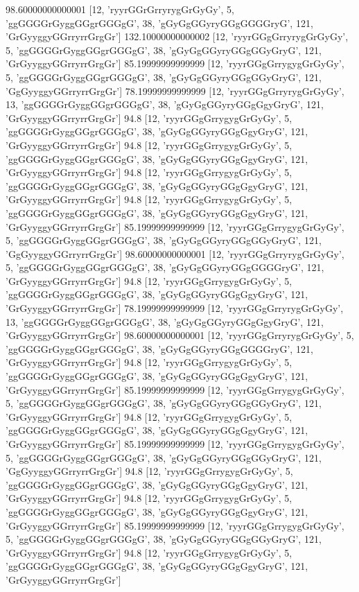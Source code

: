 98.60000000000001 [12, 'ryyrGGrGrryrygGrGyGy', 5, 'ggGGGGrGyggGGgrGGGgG', 38, 'gGyGgGGyryGGgGGGGryG', 121, 'GrGyyggyGGrryrrGrgGr']
132.10000000000002 [12, 'ryyrGGgGrryrygGrGyGy', 5, 'ggGGGGrGyggGGgrGGGgG', 38, 'gGyGgGGyryGGgGGyGryG', 121, 'GrGyyggyGGrryrrGrgGr']
85.19999999999999 [12, 'ryyrGGgGrrygygGrGyGy', 5, 'ggGGGGrGyggGGgrGGGgG', 38, 'gGyGgGGyryGGgGGyGryG', 121, 'GgGyyggyGGrryrrGrgGr']
78.19999999999999 [12, 'ryyrGGgGrryrygGrGyGy', 13, 'ggGGGGrGyggGGgrGGGgG', 38, 'gGyGgGGyryGGgGgyGryG', 121, 'GrGyyggyGGrryrrGrgGr']
94.8 [12, 'ryyrGGgGrrygygGrGyGy', 5, 'ggGGGGrGyggGGgrGGGgG', 38, 'gGyGgGGyryGGgGgyGryG', 121, 'GrGyyggyGGrryrrGrgGr']
94.8 [12, 'ryyrGGgGrrygygGrGyGy', 5, 'ggGGGGrGyggGGgrGGGgG', 38, 'gGyGgGGyryGGgGgyGryG', 121, 'GrGyyggyGGrryrrGrgGr']
94.8 [12, 'ryyrGGgGrrygygGrGyGy', 5, 'ggGGGGrGyggGGgrGGGgG', 38, 'gGyGgGGyryGGgGgyGryG', 121, 'GrGyyggyGGrryrrGrgGr']
94.8 [12, 'ryyrGGgGrrygygGrGyGy', 5, 'ggGGGGrGyggGGgrGGGgG', 38, 'gGyGgGGyryGGgGgyGryG', 121, 'GrGyyggyGGrryrrGrgGr']
85.19999999999999 [12, 'ryyrGGgGrrygygGrGyGy', 5, 'ggGGGGrGyggGGgrGGGgG', 38, 'gGyGgGGyryGGgGGyGryG', 121, 'GgGyyggyGGrryrrGrgGr']
98.60000000000001 [12, 'ryyrGGgGrryrygGrGyGy', 5, 'ggGGGGrGyggGGgrGGGgG', 38, 'gGyGgGGyryGGgGGGGryG', 121, 'GrGyyggyGGrryrrGrgGr']
94.8 [12, 'ryyrGGgGrrygygGrGyGy', 5, 'ggGGGGrGyggGGgrGGGgG', 38, 'gGyGgGGyryGGgGgyGryG', 121, 'GrGyyggyGGrryrrGrgGr']
78.19999999999999 [12, 'ryyrGGgGrryrygGrGyGy', 13, 'ggGGGGrGyggGGgrGGGgG', 38, 'gGyGgGGyryGGgGgyGryG', 121, 'GrGyyggyGGrryrrGrgGr']
98.60000000000001 [12, 'ryyrGGgGrryrygGrGyGy', 5, 'ggGGGGrGyggGGgrGGGgG', 38, 'gGyGgGGyryGGgGGGGryG', 121, 'GrGyyggyGGrryrrGrgGr']
94.8 [12, 'ryyrGGgGrrygygGrGyGy', 5, 'ggGGGGrGyggGGgrGGGgG', 38, 'gGyGgGGyryGGgGgyGryG', 121, 'GrGyyggyGGrryrrGrgGr']
85.19999999999999 [12, 'ryyrGGgGrrygygGrGyGy', 5, 'ggGGGGrGyggGGgrGGGgG', 38, 'gGyGgGGyryGGgGGyGryG', 121, 'GrGyyggyGGrryrrGrgGr']
94.8 [12, 'ryyrGGgGrrygygGrGyGy', 5, 'ggGGGGrGyggGGgrGGGgG', 38, 'gGyGgGGyryGGgGgyGryG', 121, 'GrGyyggyGGrryrrGrgGr']
85.19999999999999 [12, 'ryyrGGgGrrygygGrGyGy', 5, 'ggGGGGrGyggGGgrGGGgG', 38, 'gGyGgGGyryGGgGGyGryG', 121, 'GgGyyggyGGrryrrGrgGr']
94.8 [12, 'ryyrGGgGrrygygGrGyGy', 5, 'ggGGGGrGyggGGgrGGGgG', 38, 'gGyGgGGyryGGgGgyGryG', 121, 'GrGyyggyGGrryrrGrgGr']
94.8 [12, 'ryyrGGgGrrygygGrGyGy', 5, 'ggGGGGrGyggGGgrGGGgG', 38, 'gGyGgGGyryGGgGgyGryG', 121, 'GrGyyggyGGrryrrGrgGr']
85.19999999999999 [12, 'ryyrGGgGrrygygGrGyGy', 5, 'ggGGGGrGyggGGgrGGGgG', 38, 'gGyGgGGyryGGgGGyGryG', 121, 'GrGyyggyGGrryrrGrgGr']
94.8 [12, 'ryyrGGgGrrygygGrGyGy', 5, 'ggGGGGrGyggGGgrGGGgG', 38, 'gGyGgGGyryGGgGgyGryG', 121, 'GrGyyggyGGrryrrGrgGr']
